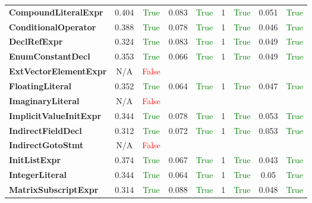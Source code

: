 \documentclass{article}
\begin{document}
\begin{xltabular}{\textwidth}{lcccccccc}
\textbf{{\fontsize{10}{12}\selectfont CompoundLiteralExpr}}& 0.404&\textcolor{green}{True}& 0.083&\textcolor{green}{True}& 1&\textcolor{green}{True}& 0.051&\textcolor{green}{True} \\[0.5ex]
\textbf{{\fontsize{10}{12}\selectfont ConditionalOperator}}& 0.388&\textcolor{green}{True}& 0.078&\textcolor{green}{True}& 1&\textcolor{green}{True}& 0.046&\textcolor{green}{True} \\[0.5ex]
\textbf{{\fontsize{10}{12}\selectfont DeclRefExpr}}& 0.324&\textcolor{green}{True}& 0.083&\textcolor{green}{True}& 1&\textcolor{green}{True}& 0.049&\textcolor{green}{True} \\[0.5ex]
\textbf{{\fontsize{10}{12}\selectfont EnumConstantDecl}}& 0.353&\textcolor{green}{True}& 0.066&\textcolor{green}{True}& 1&\textcolor{green}{True}& 0.049&\textcolor{green}{True} \\[0.5ex]
\textbf{{\fontsize{10}{12}\selectfont ExtVectorElementExpr}}& N/A&\textcolor{red}{False} \\[0.5ex]
\textbf{{\fontsize{10}{12}\selectfont FloatingLiteral}}& 0.352&\textcolor{green}{True}& 0.064&\textcolor{green}{True}& 1&\textcolor{green}{True}& 0.047&\textcolor{green}{True} \\[0.5ex]
\textbf{{\fontsize{10}{12}\selectfont ImaginaryLiteral}}& N/A&\textcolor{red}{False} \\[0.5ex]
\textbf{{\fontsize{10}{12}\selectfont ImplicitValueInitExpr}}& 0.344&\textcolor{green}{True}& 0.078&\textcolor{green}{True}& 1&\textcolor{green}{True}& 0.053&\textcolor{green}{True} \\[0.5ex]
\textbf{{\fontsize{10}{12}\selectfont IndirectFieldDecl}}& 0.312&\textcolor{green}{True}& 0.072&\textcolor{green}{True}& 1&\textcolor{green}{True}& 0.053&\textcolor{green}{True} \\[0.5ex]
\textbf{{\fontsize{10}{12}\selectfont IndirectGotoStmt}}& N/A&\textcolor{red}{False} \\[0.5ex]
\textbf{{\fontsize{10}{12}\selectfont InitListExpr}}& 0.374&\textcolor{green}{True}& 0.067&\textcolor{green}{True}& 1&\textcolor{green}{True}& 0.043&\textcolor{green}{True} \\[0.5ex]
\textbf{{\fontsize{10}{12}\selectfont IntegerLiteral}}& 0.344&\textcolor{green}{True}& 0.064&\textcolor{green}{True}& 1&\textcolor{green}{True}& 0.05&\textcolor{green}{True} \\[0.5ex]
\textbf{{\fontsize{10}{12}\selectfont MatrixSubscriptExpr}}& 0.314&\textcolor{green}{True}& 0.088&\textcolor{green}{True}& 1&\textcolor{green}{True}& 0.048&\textcolor{green}{True} \\[0.5ex]

\end{xltabular}
\end{document}
